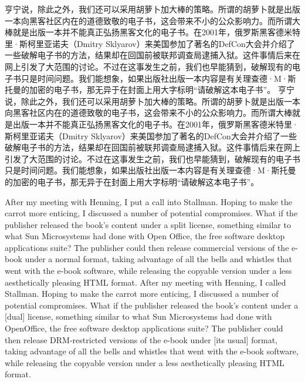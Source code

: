 \ifdefined\chs
\ifdefined\vone
亨宁说，除此之外，我们还可以采用胡萝卜加大棒的策略。所谓的胡萝卜就是出版一本向黑客社区内在的道德致敬的电子书，这会带来不小的公众影响力。而所谓大棒就是出版一本并不能真正弘扬黑客文化的电子书。在2001年，俄罗斯黑客德米特里·斯柯里亚诺夫（Dmitry Sklyarov）来美国参加了著名的DefCon大会并介绍了一些破解电子书的方法，结果却在回国前被联邦调查局逮捕入狱。这件事情后来在网上引发了大范围的讨论。不过在这事发生之前，我们也早能猜到，破解现有的电子书只是时间问题。我们能想象，如果出版社出版一本内容是有关理查德·M·斯托曼的加密的电子书，那无异于在封面上用大字标明``请破解这本电子书''。
\fi
\ifdefined\vtwo
亨宁说，除此之外，我们还可以采用胡萝卜加大棒的策略。所谓的胡萝卜就是出版一本向黑客社区内在的道德致敬的电子书，这会带来不小的公众影响力。而所谓大棒就是出版一本并不能真正弘扬黑客文化的电子书。在2001年，俄罗斯黑客德米特里·斯柯里亚诺夫（Dmitry Sklyarov）来美国参加了著名的DefCon大会并介绍了一些破解电子书的方法，结果却在回国前被联邦调查局逮捕入狱。这件事情后来在网上引发了大范围的讨论。不过在这事发生之前，我们也早能猜到，破解现有的电子书只是时间问题。我们能想象，如果出版社出版一本内容是有关理查德·M·斯托曼的加密的电子书，那无异于在封面上用大字标明``请破解这本电子书''。
\fi
\fi

\ifdefined\eng
\ifdefined\vone
After my meeting with Henning, I put a call into Stallman. Hoping to make the carrot more enticing, I discussed a number of potential compromises. What if the publisher released the book's content under a split license, something similar to what Sun Microsystems had done with Open Office, the free software desktop applications suite? The publisher could then release commercial versions of the e-book under a normal format, taking advantage of all the bells and whistles that went with the e-book software, while releasing the copyable version under a less aesthetically pleasing HTML format.
\fi
\ifdefined\vtwo
After my meeting with Henning, I called Stallman. Hoping to make the carrot more enticing, I discussed a number of potential compromises. What if the publisher released the book's content under a [dual] license, something similar to what Sun Microsystems had done with OpenOffice, the free software desktop applications suite? The publisher could then release DRM-restricted versions of the e-book under [its usual] format, taking advantage of all the bells and whistles that went with the e-book software, while releasing the copyable version under a less aesthetically pleasing HTML format.
\fi
\fi

